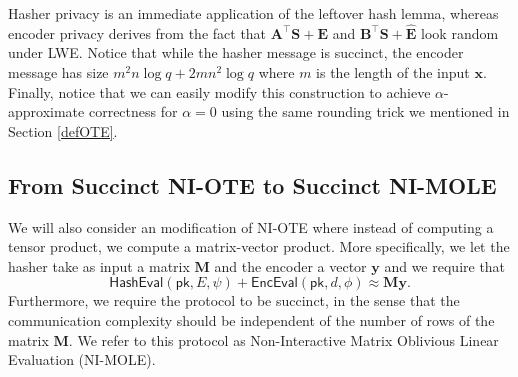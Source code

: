 \documentclass{theoretics}
\newcommand{\algofont}[1]{\ensuremath{\mathsf{#1}}}
\newcommand{\Enc}{{\algofont{Enc}}}
\newcommand{\Eval}{\algofont{Eval}\xspace}
\newcommand{\Hash}{{\algofont{Hash}}}
\newcommand{\pk}{{\mathsf{pk}}}
\begin{document}
{
Hasher privacy is an immediate application of the leftover hash lemma, whereas encoder privacy derives from the fact that $\mathbf{A}^\intercal \mathbf{S}+ \mathbf{E}$ and $\mathbf{B}^\intercal \mathbf{S}+ \hat{\mathbf{E}}$ look random under LWE. Notice that while the hasher message is succinct, the encoder message has size $m^2n\log q+2mn^2\log q$ where $m$ is the length of the input $\mathbf{x}$. Finally, notice that we can easily modify this construction to achieve $\alpha$-approximate correctness for $\alpha=0$ using the same rounding trick we mentioned in Section \ref{defOTE}.}
\subsection{From Succinct NI-OTE to Succinct NI-MOLE}\label{sec:MOLE}

We will also consider an modification of NI-OTE where instead of computing a tensor product, we compute a matrix-vector product. More specifically, we let the hasher take as input a matrix $\mathbf{M}$ and the encoder a vector $\mathbf{y}$ and we require that
\[
\Hash\Eval(\pk, E, \psi)+\Enc\Eval(\pk, d, \phi) \approx \mathbf{M} \mathbf{y}.
\]
Furthermore, we require the protocol to be succinct, in the sense that the communication complexity should be independent of the number of rows of the matrix $\mathbf{M}$. We refer to this protocol as Non-Interactive Matrix Oblivious Linear Evaluation (NI-MOLE).
\end{document}
